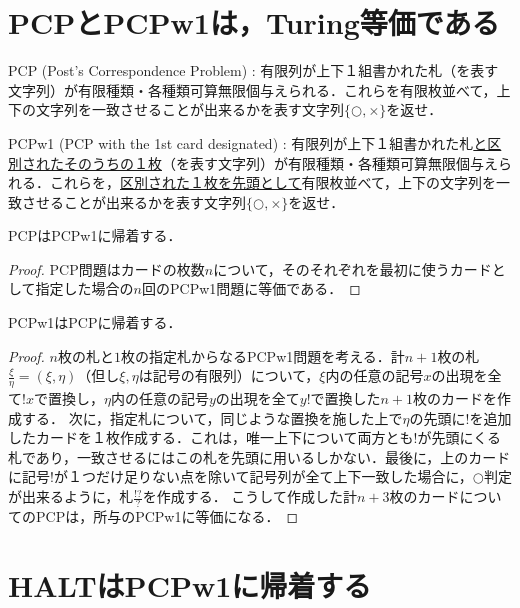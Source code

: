 \documentclass[uplatex, dvipdfmx]{jsarticle}
\begin{document}
\section{PCPとPCPw1は，Turing等価である}

\begin{screen}
    PCP (Post's Correspondence Problem) : 有限列が上下１組書かれた札（を表す文字列）が有限種類・各種類可算無限個与えられる．これらを有限枚並べて，上下の文字列を一致させることが出来るかを表す文字列$\{\bigcirc,\times\}$を返せ．

    PCPw1 (PCP with the 1st card designated) : 有限列が上下１組書かれた札\underline{と区別されたそのうちの１枚}（を表す文字列）が有限種類・各種類可算無限個与えられる．これらを，\underline{区別された１枚を先頭として}有限枚並べて，上下の文字列を一致させることが出来るかを表す文字列$\{\bigcirc,\times\}$を返せ．
\end{screen}

\begin{proposition}\label{prop-1}
    PCPはPCPw1に帰着する．
\end{proposition}
\begin{proof}
    PCP問題はカードの枚数$n$について，そのそれぞれを最初に使うカードとして指定した場合の$n$回のPCPw1問題に等価である．
\end{proof}

\begin{proposition}\label{prop-2}
    PCPw1はPCPに帰着する．
\end{proposition}
\begin{proof}
    $n$枚の札と$1$枚の指定札からなるPCPw1問題を考える．計$n+1$枚の札$\frac{\xi}{\eta}=(\xi,\eta)$（但し$\xi,\eta$は記号の有限列）について，$\xi$内の任意の記号$x$の出現を全て$!x$で置換し，$\eta$内の任意の記号$y$の出現を全て$y!$で置換した$n+1$枚のカードを作成する．
    次に，指定札について，同じような置換を施した上で$\eta$の先頭に$!$を追加したカードを１枚作成する．これは，唯一上下について両方とも$!$が先頭にくる札であり，一致させるにはこの札を先頭に用いるしかない．最後に，上のカードに記号$!$が１つだけ足りない点を除いて記号列が全て上下一致した場合に，$\bigcirc$判定が出来るように，札$\frac{!?}{?}$を作成する．
    こうして作成した計$n+3$枚のカードについてのPCPは，所与のPCPw1に等価になる．
\end{proof}

\section{HALTはPCPw1に帰着する}
\end{document}

